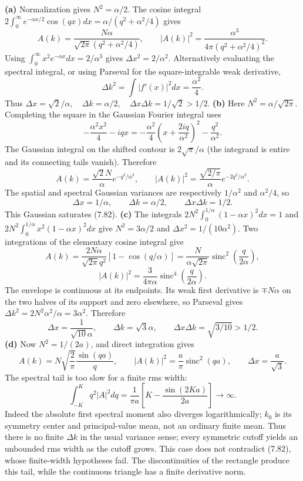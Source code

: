 \textbf{(a)} Normalization gives $N^2=\alpha/2$. The cosine integral
$2\int_0^\infty e^{-\alpha x/2}\cos(qx)dx
=\alpha/(q^2+\alpha^2/4)$ gives
\[
A(k)=\frac{N\alpha}{\sqrt{2\pi}(q^2+\alpha^2/4)},\qquad
\boxed{|A(k)|^2=\frac{\alpha^3}{4\pi(q^2+\alpha^2/4)^2}.}
\]
Using $\int_0^\infty x^2e^{-\alpha x}dx=2/\alpha^3$ gives
$\Delta x^2=2/\alpha^2$. Alternatively evaluating the spectral
integral, or using Parseval for the square-integrable weak derivative,
\[
\Delta k^2=\int|f'(x)|^2dx=\frac{\alpha^2}{4}.
\]
Thus $\boxed{\Delta x=\sqrt2/\alpha,\quad\Delta k=\alpha/2,
\quad\Delta x\Delta k=1/\sqrt2>1/2}$.
\textbf{(b)} Here $N^2=\alpha/\sqrt{2\pi}$. Completing the square
in the Gaussian Fourier integral uses
\[
-\frac{\alpha^2x^2}{4}-iqx
=-\frac{\alpha^2}{4}\left(x+\frac{2iq}{\alpha^2}\right)^2
-\frac{q^2}{\alpha^2}.
\]
The Gaussian integral on the shifted contour is
$2\sqrt\pi/\alpha$ (the integrand is entire and its connecting
tails vanish).  Therefore
\[
A(k)=\frac{\sqrt2N}{\alpha}e^{-q^2/\alpha^2},\qquad
\boxed{|A(k)|^2=\frac{\sqrt{2/\pi}}{\alpha}e^{-2q^2/\alpha^2}.}
\]
The spatial and spectral Gaussian variances are respectively
$1/\alpha^2$ and $\alpha^2/4$, so
\[
\boxed{\Delta x=1/\alpha,\qquad\Delta k=\alpha/2,
\qquad\Delta x\Delta k=1/2.}
\]
This Gaussian saturates (7.82).
\textbf{(c)} The integrals
$2N^2\int_0^{1/\alpha}(1-\alpha x)^2dx=1$ and
$2N^2\int_0^{1/\alpha}x^2(1-\alpha x)^2dx$
give $N^2=3\alpha/2$ and $\Delta x^2=1/(10\alpha^2)$.
Two integrations of the elementary cosine integral give
\[
A(k)=\frac{2N\alpha}{\sqrt{2\pi}q^2}
 [1-\cos(q/\alpha)]
=\frac{N}{\alpha\sqrt{2\pi}}
 \operatorname{sinc}^2\!\left(\frac{q}{2\alpha}\right),
\]
\[
\boxed{|A(k)|^2=\frac3{4\pi\alpha}
\operatorname{sinc}^4\!\left(\frac{q}{2\alpha}\right).}
\]
The envelope is continuous at its endpoints. Its weak first derivative
is $\mp N\alpha$ on the two halves of its support and zero elsewhere,
so Parseval gives
$\Delta k^2=2N^2\alpha^2/\alpha=3\alpha^2$. Therefore
\[
\boxed{\Delta x=\frac1{\sqrt{10}\alpha},\qquad
\Delta k=\sqrt3\alpha,\qquad
\Delta x\Delta k=\sqrt{3/10}>1/2.}
\]
\textbf{(d)} Now $N^2=1/(2a)$, and direct integration gives
\[
A(k)=N\sqrt{\frac2\pi}\frac{\sin(qa)}q,\qquad
\boxed{|A(k)|^2=\frac a\pi\operatorname{sinc}^2(qa),\qquad
\Delta x=\frac a{\sqrt3}.}
\]
The spectral tail is too slow for a finite rms width:
\[
\int_{-K}^{K}q^2|A|^2dq
=\frac1{\pi a}\left[K-\frac{\sin(2Ka)}{2a}\right]
\longrightarrow\infty.
\]
Indeed the absolute first spectral moment also diverges logarithmically;
$k_0$ is its symmetry center and principal-value mean, not an ordinary
finite mean. Thus there is no finite $\Delta k$ in the usual variance
sense; every symmetric cutoff yields an unbounded rms width as the
cutoff grows. This case does not contradict (7.82), whose finite-width
hypotheses fail. The discontinuities of the rectangle produce this
tail, while the continuous triangle has a finite derivative norm.

